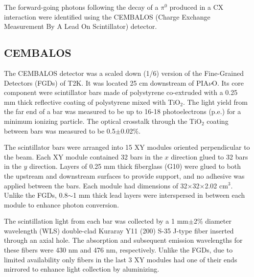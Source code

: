 The forward-going photons following the decay of a $\pi^0$ produced in a CX interaction were identified using the CEMBALOS (Charge Exchange Measurement By A Lead On Scintillator) detector.

\subsection{CEMBALOS}
The CEMBALOS detector was a scaled down (1/6) version of the Fine-Grained Detectors (FGDs) \cite{fgd} of T2K. It was located 25 cm downstream of PIA$\nu$O. Its core component were scintillator bars made of polystyrene co-extruded with a 0.25 mm thick reflective coating of polystyrene {\color{red}mixed} with TiO$_2$. The light yield from the far end of a bar was measured to be up to 16-18 photoelectrons (p.e.) for a minimum ionizing particle. The optical crosstalk through the TiO$_2$ coating between bars was measured to be 0.5$\pm$0.02\%. 

The scintillator bars were arranged into 15 XY modules oriented perpendicular to the beam. Each XY module contained 32 bars in the $x$ direction glued to 32 bars in the $y$ direction. Layers of 0.25 mm thick fiberglass (G10) were glued to both the upstream and downstream surfaces to provide support, and no adhesive was applied between the bars. Each module had dimensions of 32$\times$32$\times$2.02 cm$^3$. Unlike the FGDs, 0.8$\sim$1 mm thick lead layers were interspersed in between each module to enhance photon conversion. 


The scintillation light from each bar was collected by a 1 mm$\pm$2\% diameter wavelength (WLS) double-clad Kuraray Y11 (200) S-35 J-type fiber inserted through an axial hole. The absorption and subsequent emission wavelengths for these fibers were 430 nm and 476 nm, respectively. Unlike the FGDs, due to limited availability only fibers in the last 3 XY modules had one of their ends mirrored to enhance light collection by aluminizing.

